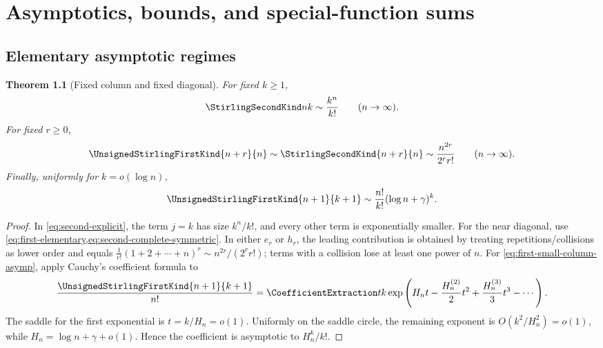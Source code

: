 \documentclass[11pt,a4paper,oneside,openany]{book}
\newtheorem{theorem}{Theorem}[chapter]
\theoremstyle{definition}
\theoremstyle{remark}
\begin{document}
\chapter{Asymptotics, bounds, and special-function sums}
\label{ch:stirling-asymptotics}

\section{Elementary asymptotic regimes}
\begin{theorem}[Fixed column and fixed diagonal]\label{thm:stirling-simple-asymp}
For fixed $k\ge1$,
\begin{equation}\label{eq:second-fixed-column-asymp}
 \StirlingSecondKind nk\sim\frac{k^n}{k!}\qquad(n\to\infty).
\end{equation}
For fixed $r\ge0$,
\begin{equation}\label{eq:both-near-diagonal-asymp}
 \UnsignedStirlingFirstKind{n+r}{n}\sim\StirlingSecondKind{n+r}{n}
 \sim\frac{n^{2r}}{2^rr!}\qquad(n\to\infty).
\end{equation}
Finally, uniformly for $k=o(\log n)$,
\begin{equation}\label{eq:first-small-column-asymp}
 \UnsignedStirlingFirstKind{n+1}{k+1}
 \sim\frac{n!}{k!}(\log n+\gamma)^k.
\end{equation}
\end{theorem}
\begin{proof}
In \cref{eq:second-explicit}, the term $j=k$ has size $k^n/k!$, and every other
term is exponentially smaller.  For the near diagonal, use
\cref{eq:first-elementary,eq:second-complete-symmetric}.  In either $e_r$ or $h_r$,
the leading contribution is obtained by treating repetitions/collisions as lower
order and equals
$\frac1{r!}(1+2+\cdots+n)^r\sim n^{2r}/(2^rr!)$; terms with a collision lose at least
one power of $n$.  For \cref{eq:first-small-column-asymp}, apply Cauchy's coefficient
formula to
\[
 \frac{\UnsignedStirlingFirstKind{n+1}{k+1}}{n!}=\CoefficientExtraction tk
 \exp\left(H_nt-\frac{H_n^{(2)}}2t^2+\frac{H_n^{(3)}}3t^3-\cdots\right).
\]
The saddle for the first exponential is $t=k/H_n=o(1)$.  Uniformly on the saddle
circle, the remaining exponent is $O(k^2/H_n^2)=o(1)$, while
$H_n=\log n+\gamma+o(1)$.  Hence the coefficient is asymptotic to $H_n^k/k!$.
\end{proof}
\end{document}
